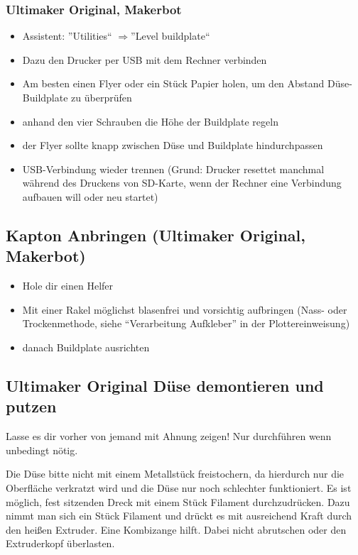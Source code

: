\documentclass{\basedir/fablab-document}
\newcommand{\ra}{$\Rightarrow$}
\begin{document}
\subsubsection{Ultimaker Original, Makerbot}
\begin{itemize}
\item Assistent: ''Utilities`` \ra ''Level buildplate``
\item Dazu den Drucker per USB mit dem Rechner verbinden
\item Am besten einen Flyer oder ein Stück Papier holen, um den Abstand Düse-Buildplate zu überprüfen
\item anhand den vier Schrauben die Höhe der Buildplate regeln
\item der Flyer sollte knapp zwischen Düse und Buildplate hindurchpassen
\item USB-Verbindung wieder trennen (Grund: Drucker resettet manchmal während des Druckens von SD-Karte, wenn der Rechner eine Verbindung aufbauen will oder neu startet)
\end{itemize}

\subsection{Kapton Anbringen (Ultimaker Original, Makerbot)}

\begin{itemize}
\item Hole dir einen Helfer
\item Mit einer Rakel möglichst blasenfrei und vorsichtig aufbringen (Nass- oder Trockenmethode, siehe \enquote{Verarbeitung Aufkleber} in der Plottereinweisung)
\item danach Buildplate ausrichten
\end{itemize}

\subsection{Ultimaker Original Düse demontieren und putzen}
Lasse es dir vorher von jemand mit Ahnung zeigen! Nur durchführen wenn unbedingt nötig.

Die Düse bitte nicht mit einem Metallstück freistochern, da hierdurch nur die Oberfläche verkratzt wird und die Düse nur noch schlechter funktioniert. Es ist möglich, fest sitzenden Dreck mit einem Stück Filament durchzudrücken. Dazu nimmt man sich ein Stück Filament und drückt es mit ausreichend Kraft durch den heißen Extruder. Eine Kombizange hilft. Dabei nicht abrutschen oder den Extruderkopf überlasten.
\end{document}
